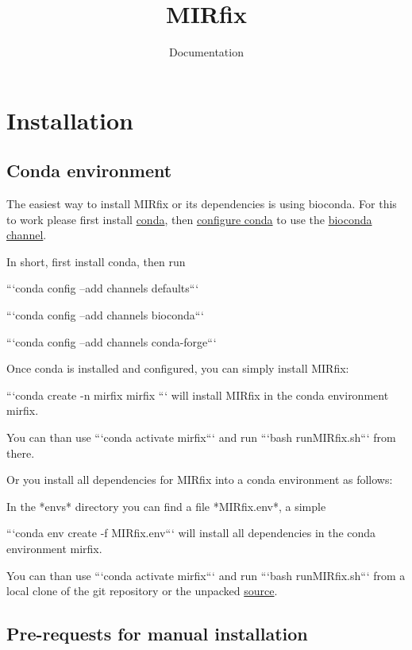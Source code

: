 \documentclass[a4paper,20pt]{report}
\title{\huge  \textbf{MIRfix}}
\author{\huge Documentation}
\date{ }
\begin{document}
\maketitle
 
\tableofcontents
\pagebreak
\chapter*{Installation}
\section{Conda environment}
\noindent
The easiest way to install MIRfix or its dependencies is using bioconda.
For this to work please first install \href{https://conda.io/projects/conda/en/latest/user-guide/install/index.html}{conda},
then \href{https://conda.io/projects/conda/en/latest/user-guide/configuration/use-condarc.html}{configure conda} to use the \href{https://bioconda.github.io/}{bioconda channel}.

In short, first install conda, then run

```conda config --add channels defaults```

```conda config --add channels bioconda```

```conda config --add channels conda-forge```

Once conda is installed and configured, you can simply install MIRfix:

```conda create -n mirfix mirfix ``` will install MIRfix in the conda environment mirfix.

You can than use ```conda activate mirfix``` and run ```bash runMIRfix.sh``` from there.


Or you install all dependencies for MIRfix into a conda environment as follows:

In the *envs* directory you can find a file *MIRfix.env*, a simple

```conda env create -f MIRfix.env``` will install all dependencies in the conda environment mirfix.

You can than use ```conda activate mirfix``` and run ```bash runMIRfix.sh``` from a local clone of the git repository or the unpacked \href{https://github.com/Bierinformatik/MIRfix/archive/v1.0.tar.gz}{source}.

\section{Pre-requests for manual installation}
\end{document}
